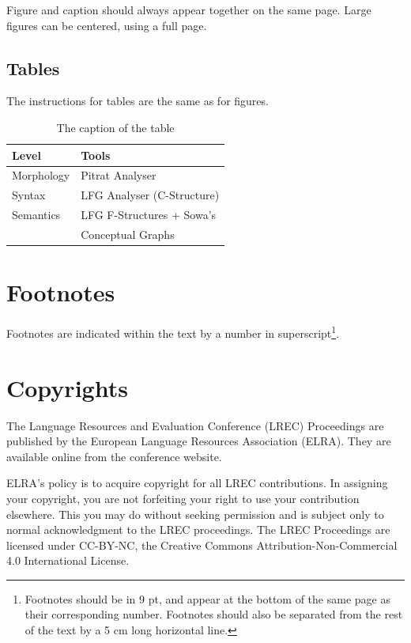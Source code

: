 \documentclass[10pt, a4paper]{article}
\begin{document}
Figure and caption should always appear together on the same page. Large figures can be centered, using a full page.

\subsection{Tables}

The instructions for tables are the same as for figures.

\begin{table}[!ht]
\begin{center}
\begin{tabularx}{\columnwidth}{|l|X|}

      \hline
      Level&Tools\\
      \hline
      Morphology & Pitrat Analyser\\
      \hline
      Syntax & LFG Analyser (C-Structure)\\
      \hline
     Semantics & LFG F-Structures + Sowa's\\
     & Conceptual Graphs\\
      \hline

\end{tabularx}
\caption{The caption of the table}
 \end{center}
\end{table}

\section{Footnotes}

Footnotes are indicated within the text by a number in superscript\footnote{Footnotes should be in  9 pt, and appear at the bottom of the same page as their corresponding number. Footnotes should also be separated from the rest of the text by a 5 cm long horizontal line.}.

\section{Copyrights}

The Language Resources and Evaluation Conference (LREC) Proceedings are published by the European Language Resources Association (ELRA). They are available online from the conference website.

ELRA's policy is to acquire copyright for all LREC contributions. In assigning your copyright, you are not forfeiting your right to use your contribution elsewhere. This you may do without seeking permission and is subject only to normal acknowledgment to the LREC proceedings. The LREC Proceedings are licensed under CC-BY-NC, the Creative Commons Attribution-Non-Commercial 4.0 International License.
\end{document}

